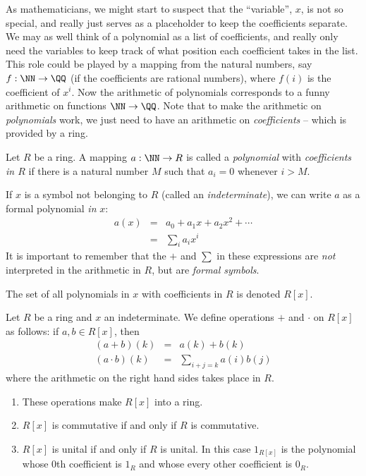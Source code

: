\documentclass{article}
\begin{document}
As mathematicians, we might start to suspect that the ``variable'', $x$, is not so special, and really just serves as a placeholder to keep the coefficients separate. We may as well think of a polynomial as a list of coefficients, and really only need the variables to keep track of what position each coefficient takes in the list. This role could be played by a mapping from the natural numbers, say $f : \NN \rightarrow \QQ$ (if the coefficients are rational numbers), where $f(i)$ is the coefficient of $x^i$. Now the arithmetic of polynomials corresponds to a funny arithmetic on functions $\NN \rightarrow \QQ$. Note that to make the arithmetic on \emph{polynomials} work, we just need to have an arithmetic on \emph{coefficients} -- which is provided by a ring.

\begin{dfn}
Let $R$ be a ring. A mapping $a : \NN \rightarrow R$ is called a \emph{polynomial} with \emph{coefficients in $R$} if there is a natural number $M$ such that $a_i = 0$ whenever $i > M$.

If $x$ is a symbol not belonging to $R$ (called an \emph{indeterminate}), we can write $a$ as a formal polynomial \emph{in} $x$:
\begin{eqnarray*}
a(x) & = & a_0 + a_1 x + a_2 x^2 + \cdots \\
     & = & \sum_i a_i x^i 
\end{eqnarray*}
It is important to remember that the $+$ and $\sum$ in these expressions are \emph{not} interpreted in the arithmetic in $R$, but are \emph{formal symbols}.

The set of all polynomials in $x$ with coefficients in $R$ is denoted $R[x]$.
\end{dfn}

\begin{prop}
Let $R$ be a ring and $x$ an indeterminate. We define operations $+$ and $\cdot$ on $R[x]$ as follows: if $a,b \in R[x]$, then 
\begin{eqnarray*}
(a + b)(k) & = & a(k) + b(k) \\
(a \cdot b)(k) & = & \sum_{i+j=k} a(i) b(j)
\end{eqnarray*}
where the arithmetic on the right hand sides takes place in $R$.
\begin{enumerate}
\item These operations make $R[x]$ into a ring.
\item $R[x]$ is commutative if and only if $R$ is commutative.
\item $R[x]$ is unital if and only if $R$ is unital. In this case $1_{R[x]}$ is the polynomial whose $0$th coefficient is $1_R$ and whose every other coefficient is $0_R$.
\end{enumerate}
\end{prop}
\end{document}
